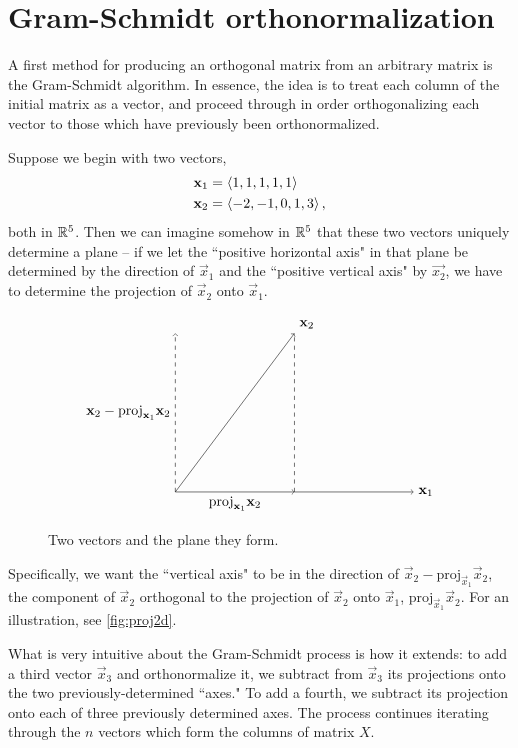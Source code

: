 \documentclass[m3380-lec-main.tex]{subfiles}
\begin{document}
\section{Gram-Schmidt orthonormalization}
A first method for producing an orthogonal matrix from an arbitrary matrix is the Gram-Schmidt algorithm. In essence, the idea is to treat each column of the initial matrix as a vector, and proceed through in order orthogonalizing each vector to those which have previously been orthonormalized.

\begin{exmp} Suppose we begin with two vectors, 
\begin{align*}
\mathbf{x}_1 &= \left\langle1,1,1,1,1\right\rangle\\
\mathbf{x}_2 &= \left\langle-2,-1,0,1,3\right\rangle,
\end{align*} both in $\mathbb{R}^5$. Then we can imagine somehow in $\mathbb{R}^5$ that these two vectors uniquely determine a plane -- if we let the ``positive horizontal axis" in that plane be determined by the direction of $\vec{x}_1$ and the ``positive vertical axis" by $\vec{x_2}$, we have to determine the projection of $\vec{x}_2$ onto $\vec{x}_1$.
\begin{figure}[hbt]
\[\begin{tikzpicture}
\draw [->] (3,0) -- (6,0) node [right] {$\vec{x}_1$};
\draw [->] (0,0) -- (3,4) node [above right] {$\vec{x}_2$};
\draw [->] (0,0) -- node [below] {$\textrm{proj}_{\vec{x}_1}\vec{x}_2$} (3,0);
\draw [dashed, ->] (0,0) -- node [left] {$\vec{x}_2-\textrm{proj}_{\vec{x}_1}\vec{x}_2$} (0,4);
\draw [dashed] (3,0) -- (3,4);
\end{tikzpicture}\]
\caption{\label{fig:proj2d}Two vectors and the plane they form.}
\end{figure}
Specifically, we want the ``vertical axis" to be in the direction of $\vec{x}_2-\textrm{proj}_{\vec{x}_1}\vec{x}_2$, the component of $\vec{x}_2$ orthogonal to the projection of $\vec{x}_2$ onto $\vec{x}_1$, $\textrm{proj}_{\vec{x}_1}\vec{x}_2$. For an illustration, see \autoref{fig:proj2d}.
\end{exmp}

What is very intuitive about the Gram-Schmidt process is how it extends: to add a third vector $\vec{x}_3$ and orthonormalize it, we subtract from $\vec{x}_3$ its projections onto the two previously-determined ``axes." To add a fourth, we subtract its projection onto each of three previously determined axes. The process continues iterating through the $n$ vectors which form the columns of matrix $X$.
\end{document}
